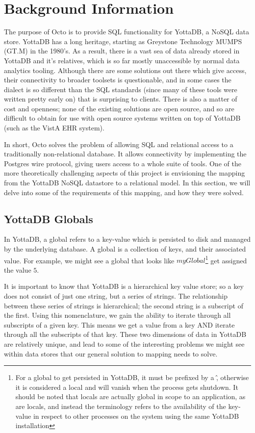 \documentclass[]{article}
\begin{document}
\section{Background Information}

The purpose of Octo is to provide SQL functionality for YottaDB, a NoSQL data store.
YottaDB has a long heritage, starting as Greystone Technology MUMPS (GT.M) in the 1980's.
As a result, there is a vast sea of data already stored in YottaDB and it's relatives, which is so far mostly unaccessible by normal data analytics tooling.
Although there are some solutions out there which give access, their connectivity to broader toolsets is questionable, and in some cases the dialect is so different than the SQL standards (since many of these tools were written pretty early on) that is surprising to clients.
There is also a matter of cost and openness; none of the existing solutions are open source, and so are difficult to obtain for use with open source systems written on top of YottaDB (such as the VistA EHR system).

In short, Octo solves the problem of allowing SQL and relational access to a traditionally non-relational database.
It allows connectivity by implementing the Postgres wire protocol, giving users access to a whole suite of tools.
One of the more theoretically challenging aspects of this project is envisioning the mapping from the YottaDB NoSQL datastore to a relational model.
In this section, we will delve into some of the requirements of this mapping, and how they were solved.

\subsection{YottaDB Globals}

In YottaDB, a global refers to a key-value which is persisted to disk and managed by the underlying database.
A global is a collection of keys, and their associated value.
For example, we might see a global that looks like $myGlobal$\footnote{For a global to get persisted in YottaDB, it must be prefixed by a \^, otherwise it is considered a local and will vanish when the process gets shutdown. It should be noted that locals are actually global in scope to an application, as are locals, and instead the terminology refers to the availability of the key-value in respect to other processes on the system using the same YottaDB installation} get assigned the value $5$.

It is important to know that YottaDB is a hierarchical key value store; so a key does not consist of just one string, but a series of strings.
The relationship between these series of strings is hierarchical; the second string is a subscript of the first.
Using this nomenclature, we gain the ability to iterate through all subscripts of a given key.
This means we get a value from a key AND iterate through all the subscripts of that key.
These two dimensions of data in YottaDB are relatively unique, and lead to some of the interesting problems we might see within data stores that our general solution to mapping needs to solve.
\end{document}
